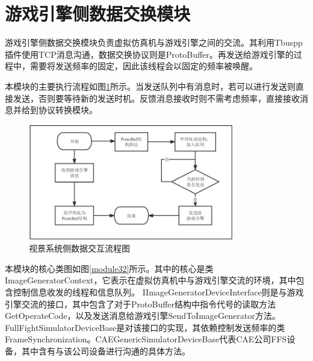 \section{游戏引擎侧数据交换模块}
游戏引擎侧数据交换模块负责虚拟仿真机与游戏引擎之间的交流。其利用Tbuspp插件使用TCP消息沟通，数据交换协议则是ProtoBuffer。再发送给游戏引擎的过程中，需要将发送频率的固定，因此该线程会以固定的频率被唤醒。
\par
本模块的主要执行流程如图\ref{module31}所示。当发送队列中有消息时，若可以进行发送则直接发送，否则要等待新的发送时机。反馈消息接收时则不需考虑频率，直接接收消息并给到协议转换模块。
\begin{figure}[h!]
    \begin{center}
        \includegraphics[width=0.8\textwidth]{pictures/flowchart3.pdf}
        \caption{视景系统侧数据交互流程图}
        \label{module31}
    \end{center}
\end{figure}
\par
本模块的核心类图如图\ref{module32}所示。其中的核心是类ImageGeneratorContext，它表示在虚拟仿真机中与游戏引擎交流的环境，其中包含控制信息收发的线程和信息队列。
IImageGeneratorDeviceInterface则是与游戏引擎交流的接口，其中包含了对于ProtoBuffer结构中指令代号的读取方法GetOperateCode，以及发送消息给游戏引擎SendToImageGenerator方法。
FullFightSimulatorDeviceBase是对该接口的实现，其依赖控制发送频率的类FrameSynchronization。CAEGenericSimulatorDeviceBase代表CAE公司FFS设备，其中含有与该公司设备进行沟通的具体方法。
